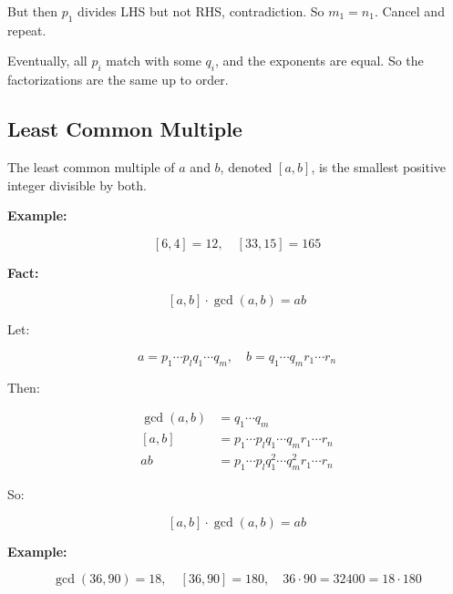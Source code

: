 But then \(p_1\) divides LHS but not RHS, contradiction. So \(m_1 = n_1\). Cancel and repeat.
\vspace{\baselineskip}

Eventually, all \(p_i\) match with some \(q_i\), and the exponents are equal. So the factorizations are the same up to order.

\QED

\subsection{Least Common Multiple}

The least common multiple of \(a\) and \(b\), denoted \([a, b]\), is the smallest positive integer divisible by both.
\vspace{\baselineskip}

\textbf{Example:}
\vspace{\baselineskip}

\[
	[6, 4] = 12, \quad [33, 15] = 165
\]

\textbf{Fact:}

\[
	[a, b] \cdot \gcd(a, b) = ab
\]

Let:

\[
	a = p_1 \cdots p_lq_1 \cdots q_m, \quad b = q_1 \cdots q_mr_1 \cdots r_n
\]

Then:

\begin{align*}
	\gcd(a, b) & = q_1 \cdots q_m                                 \\
	[a, b]     & = p_1 \cdots p_lq_1 \cdots q_mr_1 \cdots r_n     \\
	ab         & = p_1 \cdots p_lq_1^2 \cdots q_m^2r_1 \cdots r_n
\end{align*}

So:

\[
	[a, b] \cdot \gcd(a, b) = ab
\]

\textbf{Example:}

\[
	\gcd(36, 90) = 18, \quad [36, 90] = 180, \quad 36 \cdot 90 = 32400 = 18 \cdot 180
\]
